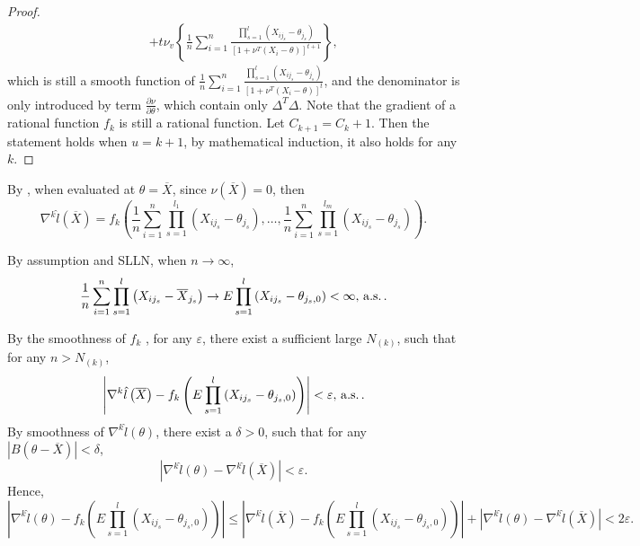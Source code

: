 \begin{proof}
\begin{eqnarray*}
 &  & +t\nu_{v}\left\{ \frac{1}{n}\sum_{i=1}^{n}\frac{\prod_{s=1}^{l}\left(X_{ij_{s}}-\theta_{j_{s}}\right)}{\left[1+\nu^{T}\left(X_{i}-\theta\right)\right]^{t+1}}\right\} ,
\end{eqnarray*}
which is still a smooth function of $\frac{1}{n}\sum_{i=1}^{n}\frac{\prod_{s=1}^{l}\left(X_{ij_{s}}-\theta_{j_{s}}\right)}{\left[1+\nu^{T}\left(X_{i}-\theta\right)\right]^{t}}$,
and the denominator is only introduced by term $\frac{\partial\nu}{\partial\theta}$,
which contain only $\Delta^{T}\Delta$. Note that the gradient of
a rational function $f_{k}$ is still a rational function. Let $C_{k+1}=C_{k}+1$.
Then the statement holds when $u=k+1$, by mathematical induction,
it also holds for any $k$. 
\end{proof}
By , when evaluated at
$\theta=\overline{X}$, since $\nu\left(\overline{X}\right)=0$, then
\[
\nabla^{k}\hat{l}\left(\overline{X}\right)=f_{k}\left(\frac{1}{n}\sum_{i=1}^{n}\prod_{s=1}^{l_{1}}\left(X_{ij_{s}}-\theta_{j_{s}}\right),\ldots,\frac{1}{n}\sum_{i=1}^{n}\prod_{s=1}^{l_{m}}\left(X_{ij_{s}}-\theta_{j_{s}}\right)\right).
\]
\begin{comment}
cut paste to other place
\end{comment}
By assumption  and SLLN, when $n\rightarrow\infty$,
\[
\frac{1}{n}\sum_{i=1}^{n}\prod_{s=1}^{l}\left(X_{ij_{s}}-\overline{X}_{j_{s}}\right)\rightarrow E\prod_{s=1}^{l}\left(X_{ij_{s}}-\theta_{j_{s},0}\right)<\infty,\,\mathrm{a.s.}\,.
\]
\begin{comment}
not enough for higher order derivative to be finite, need some properties
for f\_k.
\end{comment}
By the smoothness of $f_{k}$ , for any $\varepsilon$, there exist
a sufficient large $N_{\left(k\right)}$, such that for any $n>N_{\left(k\right)}$,
\[
\left|\nabla^{k}\hat{l}\left(\overline{X}\right)-f_{k}\left(E\prod_{s=1}^{l}\left(X_{ij_{s}}-\theta_{j_{s},0}\right)\right)\right|<\varepsilon,\,\mathrm{a.s.}\,.
\]
By smoothness of $\nabla^{k}\hat{l}\left(\theta\right)$, there exist
a $\delta>0$, such that for any $\left|B\left(\theta-\overline{X}\right)\right|<\delta$,
\[
\left|\nabla^{k}\hat{l}\left(\theta\right)-\nabla^{k}\hat{l}\left(\overline{X}\right)\right|<\varepsilon.
\]
Hence, 
\[
\left|\nabla^{k}\hat{l}\left(\theta\right)-f_{k}\left(E\prod_{s=1}^{l}\left(X_{ij_{s}}-\theta_{j_{s},0}\right)\right)\right|\le\left|\nabla^{k}\hat{l}\left(\overline{X}\right)-f_{k}\left(E\prod_{s=1}^{l}\left(X_{ij_{s}}-\theta_{j_{s},0}\right)\right)\right|+\left|\nabla^{k}\hat{l}\left(\theta\right)-\nabla^{k}\hat{l}\left(\overline{X}\right)\right|<2\varepsilon.
\]
